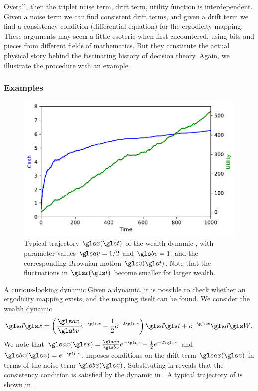 \begin{itemize}
Overall, then the triplet noise term, drift term, utility function is
interdependent. Given a noise term we can find consistent drift terms,
and given a drift term we find a consistency condition (differential
equation) for the ergodicity mapping. These arguments may seem a little
esoteric when first encountered, using bits and pieces from different 
fields of mathematics. But they constitute the actual physical story behind the
fascinating history of decision theory. Again, we illustrate the procedure with an example.

\subsubsection{Examples}

\begin{figure}
\centering
\includegraphics[width=\textwidth]{./chapter_riskless/figs/trajectories.pdf}
\caption{\small Typical trajectory $\x(\t)$ of the wealth
dynamic , with parameter values $\av=1/2$ and $\bv=1$,  and the corresponding Brownian motion $\gv(\t)$. Note that the fluctuations in $\x(\t)$ become smaller for larger wealth. }
\end{figure}

\begin{example}{A curious-looking dynamic}
Given a dynamic, it is possible to check whether an ergodicity mapping exists, 
and the mapping itself can be found. We consider the wealth dynamic
\begin{equation}
\gd\x=\left(\frac{\av}{\bv}e^{-\x}-\frac{1}{2}e^{-2\x}\right)\gd\t+e^{-\x}\gd\gW.
\elabel{test_dyn}
\end{equation}
We note that $\ax(\x)=\frac{\av}{\bv}e^{-\x}-\frac{1}{2}e^{-2\x}$ and $\bx(\x)=e^{-\x}$.
 imposes conditions on the drift term $\ax(\x)$ in terms of the 
noise term $\bx(\x)$. Substituting in  reveals that the consistency 
condition is satisfied by the dynamic in .
A typical trajectory of  is shown in .


\end{example}
\end{itemize}
